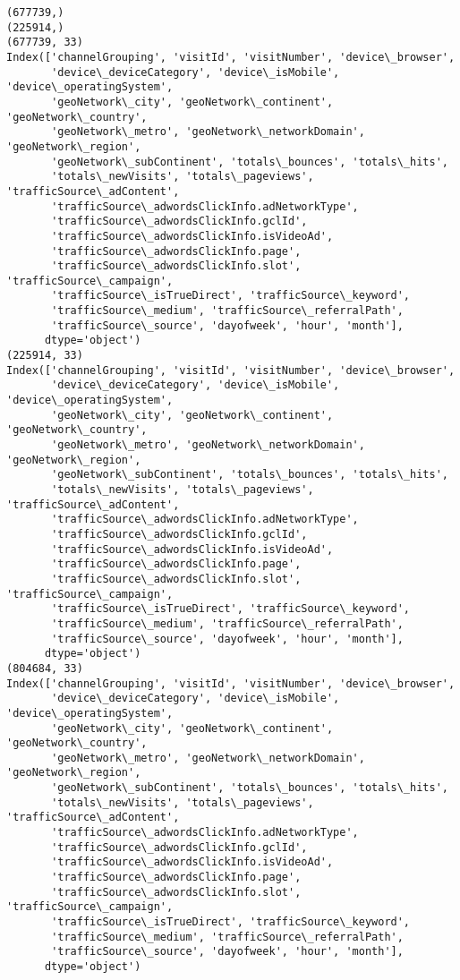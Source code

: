 \documentclass[11pt]{article}
\begin{document}
    \begin{Verbatim}[commandchars=\\\{\}]
(677739,)
(225914,)
(677739, 33)
Index(['channelGrouping', 'visitId', 'visitNumber', 'device\_browser',
       'device\_deviceCategory', 'device\_isMobile', 'device\_operatingSystem',
       'geoNetwork\_city', 'geoNetwork\_continent', 'geoNetwork\_country',
       'geoNetwork\_metro', 'geoNetwork\_networkDomain', 'geoNetwork\_region',
       'geoNetwork\_subContinent', 'totals\_bounces', 'totals\_hits',
       'totals\_newVisits', 'totals\_pageviews', 'trafficSource\_adContent',
       'trafficSource\_adwordsClickInfo.adNetworkType',
       'trafficSource\_adwordsClickInfo.gclId',
       'trafficSource\_adwordsClickInfo.isVideoAd',
       'trafficSource\_adwordsClickInfo.page',
       'trafficSource\_adwordsClickInfo.slot', 'trafficSource\_campaign',
       'trafficSource\_isTrueDirect', 'trafficSource\_keyword',
       'trafficSource\_medium', 'trafficSource\_referralPath',
       'trafficSource\_source', 'dayofweek', 'hour', 'month'],
      dtype='object')
(225914, 33)
Index(['channelGrouping', 'visitId', 'visitNumber', 'device\_browser',
       'device\_deviceCategory', 'device\_isMobile', 'device\_operatingSystem',
       'geoNetwork\_city', 'geoNetwork\_continent', 'geoNetwork\_country',
       'geoNetwork\_metro', 'geoNetwork\_networkDomain', 'geoNetwork\_region',
       'geoNetwork\_subContinent', 'totals\_bounces', 'totals\_hits',
       'totals\_newVisits', 'totals\_pageviews', 'trafficSource\_adContent',
       'trafficSource\_adwordsClickInfo.adNetworkType',
       'trafficSource\_adwordsClickInfo.gclId',
       'trafficSource\_adwordsClickInfo.isVideoAd',
       'trafficSource\_adwordsClickInfo.page',
       'trafficSource\_adwordsClickInfo.slot', 'trafficSource\_campaign',
       'trafficSource\_isTrueDirect', 'trafficSource\_keyword',
       'trafficSource\_medium', 'trafficSource\_referralPath',
       'trafficSource\_source', 'dayofweek', 'hour', 'month'],
      dtype='object')
(804684, 33)
Index(['channelGrouping', 'visitId', 'visitNumber', 'device\_browser',
       'device\_deviceCategory', 'device\_isMobile', 'device\_operatingSystem',
       'geoNetwork\_city', 'geoNetwork\_continent', 'geoNetwork\_country',
       'geoNetwork\_metro', 'geoNetwork\_networkDomain', 'geoNetwork\_region',
       'geoNetwork\_subContinent', 'totals\_bounces', 'totals\_hits',
       'totals\_newVisits', 'totals\_pageviews', 'trafficSource\_adContent',
       'trafficSource\_adwordsClickInfo.adNetworkType',
       'trafficSource\_adwordsClickInfo.gclId',
       'trafficSource\_adwordsClickInfo.isVideoAd',
       'trafficSource\_adwordsClickInfo.page',
       'trafficSource\_adwordsClickInfo.slot', 'trafficSource\_campaign',
       'trafficSource\_isTrueDirect', 'trafficSource\_keyword',
       'trafficSource\_medium', 'trafficSource\_referralPath',
       'trafficSource\_source', 'dayofweek', 'hour', 'month'],
      dtype='object')

    \end{Verbatim}
\end{document}

